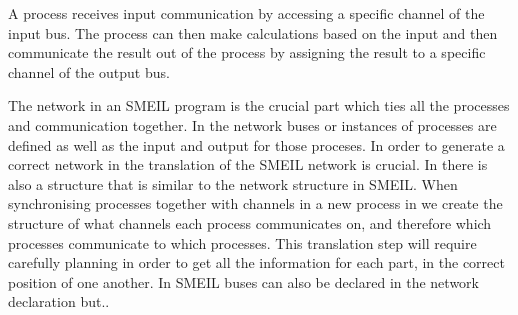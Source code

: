 A process receives input communication by accessing a specific channel of the input bus. The process can then make calculations based on the input and then communicate the result out of the process by assigning the result to a specific channel of the output bus.





The network in an SMEIL program is the crucial part which ties all the processes and communication together. In the network buses or instances of processes are defined as well as the input and output for those proceses. In order to generate a correct network in \cspm the translation of the SMEIL network is crucial.
In \cspm there is also a structure that is similar to the network structure in SMEIL. When synchronising processes together with channels in a new process in \cspm we create the structure of what channels each process communicates on, and therefore which processes communicate to which processes.
This translation step will require carefully planning in order to get all the information for each part, in the correct position of one another. In SMEIL buses can also be declared in the network declaration but.. %




